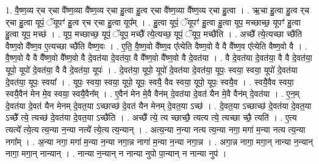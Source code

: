 \documentclass[17pt]{extarticle}
\begin{document}
1. वै॒ष्ण॒व्य र्‌च र्‌चा वै᳚ष्ण॒व्या वै᳚ष्ण॒व्य र्‌चा हु॒त्वा हु॒त्व र्‌चा वै᳚ष्ण॒व्या वै᳚ष्ण॒व्य र्‌चा हु॒त्वा । . ऋ॒चा हु॒त्वा हु॒त्व र्‌च र्‌चा हु॒त्वा यूपं॒ ॅयूपꣳ॑ हु॒त्व र्‌च र्‌चा हु॒त्वा यूप᳚म् । . हु॒त्वा यूपं॒ ॅयूपꣳ॑ हु॒त्वा हु॒त्वा यूप॒ मच्छाच्छ॒ यूपꣳ॑ हु॒त्वा हु॒त्वा यूप॒ मच्छ॑ । . यूप॒ मच्छाच्छ॒ यूपं॒ ॅयूप॒ मच्छै᳚ त्ये॒त्यच्छ॒ यूपं॒ ॅयूप॒ मच्छै॑ति । . अच्छै᳚ त्ये॒त्यच्छा च्छै॑ति वैष्ण॒वो वै᳚ष्ण॒व ए॒त्यच्छा च्छै॑ति वैष्ण॒वः । . ए॒ति॒ वै॒ष्ण॒वो वै᳚ष्ण॒व ए᳚त्येति वैष्ण॒वो वै वै वै᳚ष्ण॒व ए᳚त्येति वैष्ण॒वो वै । . वै॒ष्ण॒वो वै वै वै᳚ष्ण॒वो वै᳚ष्ण॒वो वै दे॒वत॑या दे॒वत॑या॒ वै वै᳚ष्ण॒वो वै᳚ष्ण॒वो वै दे॒वत॑या । . वै दे॒वत॑या दे॒वत॑या॒ वै वै दे॒वत॑या॒ यूपो॒ यूपो॑ दे॒वत॑या॒ वै वै दे॒वत॑या॒ यूपः॑ । . दे॒वत॑या॒ यूपो॒ यूपो॑ दे॒वत॑या दे॒वत॑या॒ यूपः॒ स्वया॒ स्वया॒ यूपो॑ दे॒वत॑या दे॒वत॑या॒ यूपः॒ स्वया᳚ । . यूपः॒ स्वया॒ स्वया॒ यूपो॒ यूपः॒ स्वयै॒ वैव स्वया॒ यूपो॒ यूपः॒ स्वयै॒व । . स्वयै॒वैव स्वया॒ स्वयै॒वैन॑ मेन मे॒व स्वया॒ स्वयै॒वैन᳚म् । . ए॒वैन॑ मेन मे॒वै वैन॑म् दे॒वत॑या दे॒वत॑ यैन मे॒वै वैन॑म् दे॒वत॑या । . ए॒न॒म् दे॒वत॑या दे॒वत॑ यैन मेनम् दे॒वत॒या ऽच्छाच्छ॑ दे॒वत॑ यैन मेनम् दे॒वत॒या ऽच्छ॑ । . दे॒वत॒या ऽच्छाच्छ॑ दे॒वत॑या दे॒वत॒या ऽच्छै᳚ त्ये॒ त्यच्छ॑ दे॒वत॑या दे॒वत॒या ऽच्छै॑ति । . अच्छै᳚ त्ये॒ त्य च्छाच्छै॒ त्यत्य त्ये॒ त्यच्छा च्छै॒ त्यति॑ । . ए॒त्य त्यत्ये᳚ त्ये॒त्य त्य॒न्या न॒न्या नत्ये᳚ त्ये॒त्य त्य॒न्यान् । . अत्य॒न्या न॒न्या नत्य त्य॒न्या नगा॒ मगा॑ म॒न्या नत्य त्य॒न्या नगा᳚म् । . अ॒न्या नगा॒ मगा॑ म॒न्या न॒न्या नगा॒न्न नागा॑ म॒न्या न॒न्या नगा॒न्न । . अगा॒न्न नागा॒ मगा॒न् नान्या न॒न्यान् नागा॒ मगा॒न् नान्यान् । . नान्या न॒न्यान् न नान्या नुपो पा॒न्यान् न नान्या नुप॑ । \newline
\end{document}
